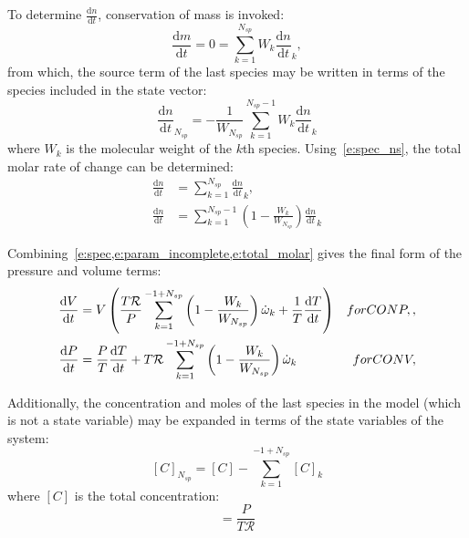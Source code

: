\documentclass[12pt]{article}
\newcommand{\ns}{N_{sp}}
\newcommand{\conp}{CONP}
\newcommand{\conv}{CONV}
\newcommand{\dconp}{\ifmmode\text{for \conp,}\else for \conp,\fi}
\newcommand{\dconv}{\ifmmode\text{for \conv,}\else for \conv,\fi}
\newcommand{\Ru}{\mathcal{R}}
\begin{document}
To determine $\frac{\text{d} n }{\text{d} t }$, conservation of mass is invoked:
\begin{equation}
 \frac{\text{d} m }{\text{d} t } = 0 = \sum_{k=1}^{\ns}  W_{k} \frac{\text{d} n }{\text{d} t }_{k},
\end{equation}
from which, the source term of the last species may be written in terms of the species included in the state vector:
\begin{equation}
 \frac{\text{d} n }{\text{d} t }_{\ns} = - \frac{1}{W_{\ns}} \sum_{k=1}^{\ns - 1} W_{k} \frac{\text{d} n }{\text{d} t }_{k}
 \label{e:spec_ns}
\end{equation}
where $W_{k}$ is the molecular weight of the $k$th species.
Using~\cref{e:spec_ns}, the total molar rate of change can be determined:
\begin{align}
\frac{\text{d} n }{\text{d} t } &= \sum_{k=1}^{\ns} \frac{\text{d} n }{\text{d} t }_{k}, \nonumber \\
\frac{\text{d} n }{\text{d} t } &= \sum_{k=1}^{\ns - 1} \left(1 - \frac{W_{k}}{W_{\ns}}\right) \frac{\text{d} n }{\text{d} t }_{k}
\label{e:total_molar}
\end{align}

Combining~\cref{e:spec,e:param_incomplete,e:total_molar} gives the final form of the pressure and volume terms:
\begin{subequations}
\label{e:param_complete}
\begin{align}
\frac{\text{d} V }{\text{d} t } &= V \left(\frac{T \Ru}{P} \sum_{k=1}^{-1 + \ns} \left(1 - \frac{W_{k}}{W_{\ns}}\right) \dot{\omega}_{k} + \frac{1}{T} \frac{\text{d} T }{\text{d} t }\right)&\dconp, \\
\frac{\text{d} P }{\text{d} t } &= \frac{P}{T} \frac{\text{d} T }{\text{d} t } + T \Ru \sum_{k=1}^{-1 + \ns} \left(1 - \frac{W_{k}}{W_{\ns}}\right) \dot{\omega}_{k}&\dconv
\end{align}
\end{subequations}

Additionally, the concentration and moles of the last species in the model (which is not a state variable) may be expanded in terms of the state variables of the system:
\begin{equation}
 \label{e:last_spec_conc}
   [C]_{\ns} = [C] - \sum_{k=1}^{-1 + \ns} [C]_{k}
\end{equation}
where $[C]$ is the total concentration:
\begin{equation}
 [C] = \frac{P}{T \Ru}
\end{equation}
\end{document}
